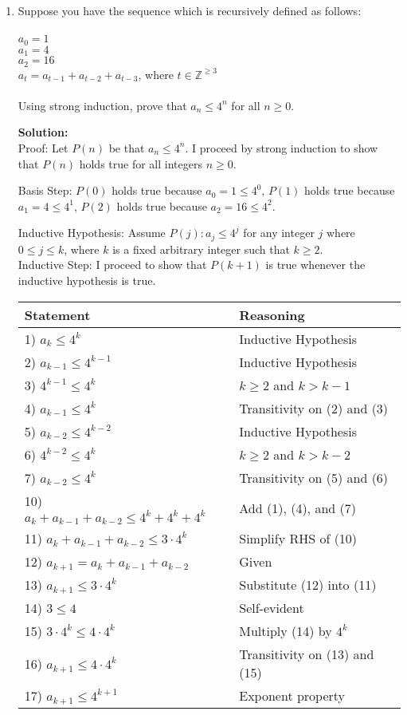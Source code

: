 \documentclass{article}
\newenvironment{solution}
{
\par
\color{blue}
\textbf{Solution:}
}
{
\par
}
\begin{document}
\begin{enumerate}
\begin{solution}
Conclusion: By strong induction, $P(n)$ is true for all integers $n>=50$.
\end{solution}

\item Suppose you have the sequence which is recursively defined as follows:\\
\\$a_0 = 1$
\\$a_1 = 4$
\\$a_2 = 16$
\\$a_t = a_{t-1}+ a_{t-2} + a_{t-3}$, where $t \in \mathbb{Z}^{\geq 3}$\\
\\Using strong induction, prove that $a_n \leq 4^n$ for all $n \geq 0$.
\begin{solution}\\
Proof: Let $P(n)$ be that $a_n \leq 4^n$. I proceed by strong induction to show that $P(n)$ holds true for all integers $n \geq 0$.

Basis Step: $P(0)$ holds true because $a_0 = 1 \leq 4^0$, $P(1)$ holds true because $a_1 = 4 \leq 4^1$, $P(2)$ holds true because $a_2 = 16 \leq 4^2$.

Inductive Hypothesis: Assume $P(j): a_j \leq 4^j$ for any integer $j$ where $0 \leq j \leq k$, where $k$ is a fixed arbitrary integer such that $k \geq 2$.\\
Inductive Step: I proceed to show that $P(k + 1)$ is true whenever the inductive hypothesis is true.
\begin{center}
\begin{tabular}{l|l}
    Statement & Reasoning\\ \hline
    1) $a_k \leq 4^k$ & Inductive Hypothesis\\
    2) $a_{k-1} \leq 4^{k-1}$ & Inductive Hypothesis\\
    3) $4^{k-1} \leq 4^k$ & $k \geq 2$ and $k > k - 1$\\
    4) $a_{k-1} \leq 4^k$ & Transitivity on (2) and (3)\\
    5) $a_{k-2} \leq 4^{k-2}$ & Inductive Hypothesis\\
    6) $4^{k-2} \leq 4^k$ & $k \geq 2$ and $k > k - 2$\\
    7) $a_{k-2} \leq 4^k$ & Transitivity on (5) and (6)\\
    10) $a_k + a_{k-1} + a_{k-2} \leq 4^k + 4^k + 4^k$ & Add (1), (4), and (7)\\
    11) $a_k + a_{k-1} + a_{k-2} \leq 3 \cdot 4^k$ & Simplify RHS of (10)\\
    12) $a_{k+1} = a_k + a_{k-1} + a_{k-2}$ & Given\\
    13) $a_{k+1} \leq 3 \cdot 4^k$ & Substitute (12) into (11)\\
    14) $3 \leq 4$ & Self-evident\\
    15) $3 \cdot 4^k \leq 4 \cdot 4^k$ & Multiply (14) by $4^k$\\
    16) $a_{k+1} \leq 4 \cdot 4^k$ & Transitivity on (13) and (15)\\
    17) $a_{k+1} \leq 4^{k+1}$ & Exponent property
\end{tabular}
\end{center}


\end{solution}
\end{enumerate}
\end{document}
